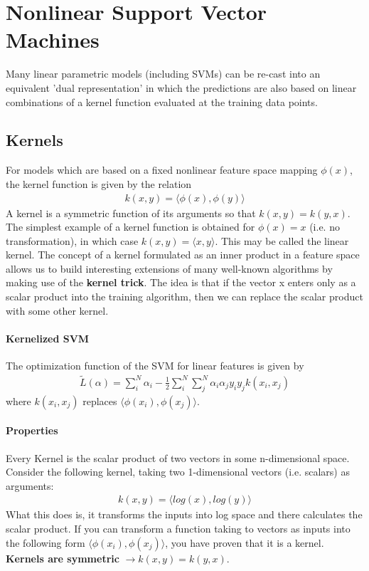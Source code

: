 \documentclass[main]{subfiles}
\begin{document}

\section{Nonlinear Support Vector Machines}
Many linear parametric models (including SVMs) can be  re-cast into an equivalent 'dual representation' in which the predictions are also based on linear combinations of a kernel function evaluated at the training data points. 
\subsection{Kernels}
For models which are based on a fixed nonlinear feature space mapping $\phi(x)$, the kernel function is given by the relation
\begin{align}
k(x,y)=\langle \phi(x), \phi(y) \rangle
\end{align}
A kernel is a symmetric function of its arguments so that $k(x,y)=k(y,x)$. The simplest example of a kernel function is obtained for $\phi(x)=x$ (i.e. no transformation), in which case $k(x,y)=\langle x,y \rangle$. This may be called the linear kernel. The concept of a kernel formulated as an inner product in a feature space allows us to build interesting extensions of many well-known algorithms by making use of the \textbf{kernel trick}. The idea is that if the vector x enters only as a scalar product into the training algorithm, then we can replace the scalar product with some other kernel. 
\paragraph{Kernelized SVM} The optimization function of the SVM for linear features is given by 
\begin{align}
\tilde{L}(\alpha)=\sum_i^N \alpha_i - \frac{1}{2} \sum_i^N \sum_j^N \alpha_i \alpha_j y_i y_j k(x_i, x_j)
\end{align}
where $k(x_i, x_j)$ replaces $\langle \phi(x_i), \phi(x_j)\rangle$.
\paragraph{Properties}
Every Kernel is the scalar product of two vectors in some n-dimensional space. Consider the following kernel, taking two 1-dimensional vectors (i.e. scalars) as arguments: 
\begin{align}
k(x,y)=\langle log(x), log(y) \rangle
\end{align}
What this does is, it transforms the inputs into log space and there calculates the scalar product. If you can transform a function taking to vectors as inputs into the following form $\langle \phi(x_i), \phi(x_j)\rangle$, you have proven that it is a kernel. \textbf{Kernels are symmetric} $\rightarrow k(x,y)=k(y,x)$.
\end{document}
